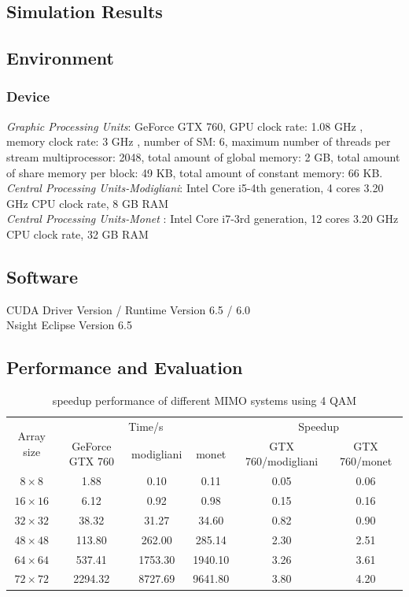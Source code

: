 \documentclass[12pt,a4paper,final]{article}
\begin{document}
\begin{spacing}{2.5}
\section{Simulation Results}\label{simulation}
\subsection{Environment}
\subsubsection{Device}
\emph{Graphic Processing Units}: GeForce GTX 760, GPU clock rate: 1.08 GHz , memory clock rate: 3 GHz , number of SM: 6, maximum number of threads per stream multiprocessor: 2048, total amount of global memory: 2 GB, total amount of share memory per block: 49 KB, total amount of constant memory: 66 KB. \\
\emph{Central Processing Units-Modigliani}: Intel Core i5-4th generation, 4 cores 3.20 GHz CPU clock rate, 8 GB RAM\\
\emph{Central Processing Units-Monet} : Intel Core i7-3rd generation, 12 cores 3.20 GHz CPU clock rate, 32 GB RAM\\
\subsection{Software}
CUDA Driver Version / Runtime Version      6.5 / 6.0\\
Nsight Eclipse Version 6.5
\subsection{Performance and Evaluation}
\begin{table}[htb]

\centering
\begin{tabular}{|c|c|c|c|c|c|}
\hline
\multirow{2}{*}{ Array size} & \multicolumn{3}{|c|}{Time/s} & \multicolumn{2}{|c|}{Speedup}\\
\cline{2-6}
&GeForce GTX 760 & modigliani & monet &  GTX 760/modigliani  &  GTX 760/monet \\
\hline
$8\times 8$& 1.88& 0.10&0.11 & 0.05& 0.06\\
\hline
$16\times 16$&6.12 & 0.92&0.98& 0.15& 0.16\\
\hline
$32\times 32$&38.32 & 31.27& 34.60& 0.82& 0.90\\
\hline
$48\times 48$&113.80& 262.00& 285.14& 2.30& 2.51\\
\hline
$64\times 64$& 537.41&1753.30&1940.10&3.26& 3.61 \\
\hline
$72\times 72 $&2294.32&8727.69 &9641.80 &3.80 &4.20 \\
\hline
\end{tabular}
\caption{speedup performance of different MIMO systems using 4 QAM}
\label{speedup1}
\end{table}




\end{spacing}
\end{document}
